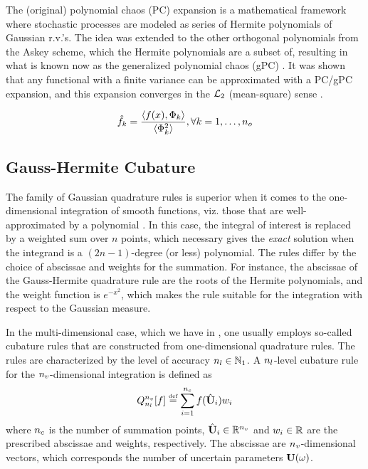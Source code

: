 The (original) polynomial chaos (PC) expansion is a mathematical framework where stochastic processes are modeled as series of Hermite polynomials of Gaussian r.v.'s. The idea was extended to the other orthogonal polynomials from the Askey scheme, which the Hermite polynomials are a subset of, resulting in what is known now as the generalized polynomial chaos (gPC) \cite{xiu2002}. It was shown that any functional with a finite variance can be approximated with a PC/gPC expansion, and this expansion converges in the $\mathcal{L}_{2}$ (mean-square) sense \cite{ghanem2003}.

\begin{equation} \elabel{pc-coefficients}
  \pcc{f}_k = \frac{\innerp{f(x), \pcb_k}}{\innerp{\pcb_k^2}}, \forall k = 1, \dotsc, \pcorder
\end{equation}

\subsection{Gauss-Hermite Cubature}
The family of Gaussian quadrature rules is superior when it comes to the one-dimensional integration of smooth functions, viz. those that are well-approximated by a polynomial \cite{press2007}. In this case, the integral of interest is replaced by a weighted sum over $n$ points, which necessary gives the \emph{exact} solution when the integrand is a $(2n - 1)$-degree (or less) polynomial. The rules differ by the choice of abscissae and weights for the summation. For instance, the abscissae of the Gauss-Hermite quadrature rule are the roots of the Hermite polynomials, and the weight function is $e^{-x^2}$, which makes the rule suitable for the integration with respect to the Gaussian measure.

In the multi-dimensional case, which we have in , one usually employs so-called cubature rules that are constructed from one-dimensional quadrature rules. The rules are characterized by the level of accuracy ${n_l} \in \mathbb{N}_{1}$. A ${n_l}$-level cubature rule for the ${n_v}$-dimensional integration is defined as
\[
  \oCubature{\cblevel}{\vars}{f} \eqdef \sum_{i = 1}^{\cbpoints} f(\cbp{\vU}_i) w_i
\]
where ${n_c}$ is the number of summation points, $\cbp{\vU}_i \in \real^\vars$ and $w_i \in \mathbb{R}$ are the prescribed abscissae and weights, respectively. The abscissae are ${n_v}$-dimensional vectors, which corresponds the number of uncertain parameters $\vU(\o)$.
